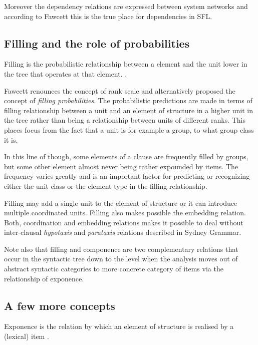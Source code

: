 Moreover the dependency relations are expressed between system networks and according to Fawcett this is the true place for dependencies in SFL. 

\subsection{Filling and the role of probabilities}
\begin{definition}[Filling]\label{def:filling}
    Filling is the probabilistic relationship between a element and the unit lower in the tree that operates at that element. \citep[p.238, 251]{Fawcett2000}. 
\end{definition}

Fawcett renounces the concept of rank scale and alternatively proposed the concept of \textit{filling probabilities}. The probabilistic predictions are made in terms of filling relationship between a unit and an element of structure in a higher unit in the tree rather than being a relationship between units of different ranks. This places focus from the fact that a unit is for example a group, to what group class it is. 

In this line of though, some elements of a clause are frequently filled by groups, but some other element almost never being rather expounded by items. The frequency varies greatly and is an important factor for predicting or recognizing either the unit class or the element type in the filling relationship. 

Filling may add a single unit to the element of structure or it can introduce multiple coordinated units. Filling also makes possible the embedding relation. Both, coordination and embedding relations makes it possible to deal without inter-clausal \textit{hypotaxis} and \textit{parataxis} relations described in Sydney Grammar.

Note also that filling and componence are two complementary relations that occur in the syntactic tree down to the level when the analysis moves out of abstract syntactic categories to more concrete category of items via the relationship of exponence. 

\subsection{A few more concepts}
\begin{definition}[Exponence]\label{def:exponence}
	Exponence is the relation by which an element of structure is realised by a (lexical) item \citep[p.254]{Fawcett2000}. 
\end{definition}

